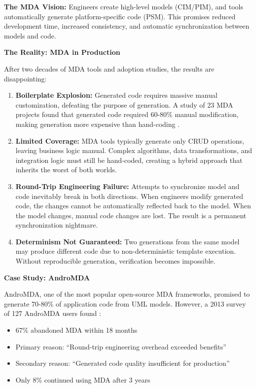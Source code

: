\textbf{The MDA Vision:} Engineers create high-level models (CIM/PIM), and tools automatically generate platform-specific code (PSM). This promises reduced development time, increased consistency, and automatic synchronization between models and code.

\textbf{The Reality: MDA in Production}

After two decades of MDA tools and adoption studies, the results are disappointing:

\begin{enumerate}
    \item \textbf{Boilerplate Explosion:} Generated code requires massive manual customization, defeating the purpose of generation. A study of 23 MDA projects found that generated code required 60-80\% manual modification, making generation more expensive than hand-coding \cite{mohagheghi2009mde}.

    \item \textbf{Limited Coverage:} MDA tools typically generate only CRUD operations, leaving business logic manual. Complex algorithms, data transformations, and integration logic must still be hand-coded, creating a hybrid approach that inherits the worst of both worlds.

    \item \textbf{Round-Trip Engineering Failure:} Attempts to synchronize model and code inevitably break in both directions. When engineers modify generated code, the changes cannot be automatically reflected back to the model. When the model changes, manual code changes are lost. The result is a permanent synchronization nightmare.

    \item \textbf{Determinism Not Guaranteed:} Two generations from the same model may produce different code due to non-deterministic template execution. Without reproducible generation, verification becomes impossible.
\end{enumerate}

\textbf{Case Study: AndroMDA}

AndroMDA, one of the most popular open-source MDA frameworks, promised to generate 70-80\% of application code from UML models. However, a 2013 survey of 127 AndroMDA users found \cite{andromda2013survey}:

\begin{itemize}
    \item 67\% abandoned MDA within 18 months
    \item Primary reason: ``Round-trip engineering overhead exceeded benefits''
    \item Secondary reason: ``Generated code quality insufficient for production''
    \item Only 8\% continued using MDA after 3 years
\end{itemize}


